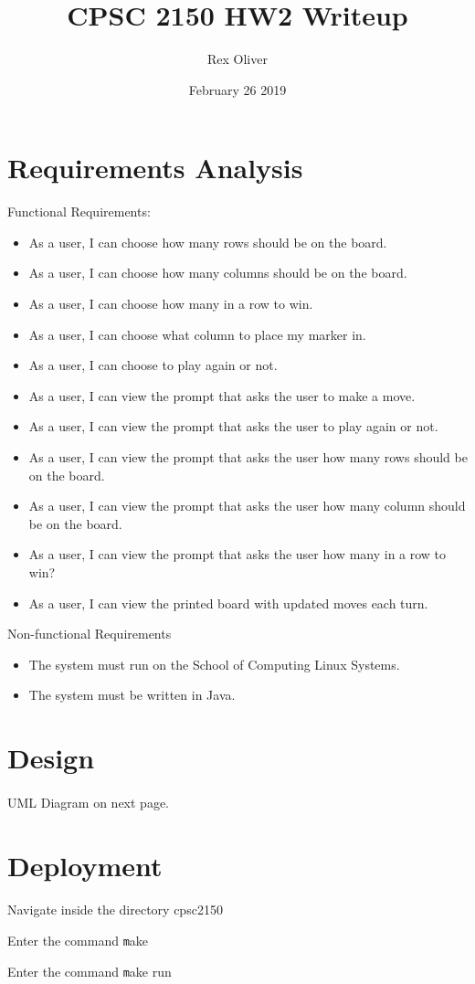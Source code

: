 \documentclass{article}
\title{CPSC 2150 HW2 Writeup}
\author{Rex Oliver}
\date{February 26 2019}
\begin{document}
\begin{titlepage}
  \maketitle
\end{titlepage}

\section{Requirements Analysis}
Functional Requirements:
\begin{itemize}
  \item As a user, I can choose how many rows should be on the board.
  \item As a user, I can choose how many columns should be on the board.
  \item As a user, I can choose how many in a row to win.
  \item As a user, I can choose what column to place my marker in.
  \item As a user, I can choose to play again or not.
  \item As a user, I can view the prompt that asks the user to make a move.
  \item As a user, I can view the prompt that asks the user to play again or
    not.
  \item As a user, I can view the prompt that asks the user how many rows should be on the board.
  \item As a user, I can view the prompt that asks the user how many column should be on the board.
  \item As a user, I can view the prompt that asks the user how many in a row to win? 
  \item As a user, I can view the printed board with updated moves each turn.
\end{itemize}
Non-functional Requirements
\begin{itemize}
\item The system must run on the School of Computing Linux Systems.
\item The system must be written in Java.
\end{itemize}  

\section{Design}
\paragraph{}
UML Diagram on next page.  


\section{Deployment}
\paragraph{}
Navigate inside the directory cpsc2150 

Enter the command \texttt make

Enter the command \texttt make run
\end{document}
